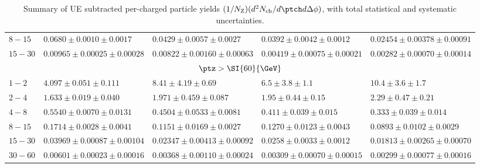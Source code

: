 \begin{table}[!ht]
\begin{center}
\begin{tabular}{|l|l|l|l|l|}
\footnotesize {$8 - 15$} & \scriptsize {$0.0680 \pm 0.0010 \pm 0.0017$}  & \scriptsize {$0.0429 \pm 0.0057 \pm 0.0027$}  & \scriptsize {$0.0392 \pm 0.0042 \pm 0.0012$}  & \scriptsize {$0.02454 \pm 0.00378 \pm 0.00091$}  \\
\footnotesize {$15 - 30$} & \scriptsize {$0.00965 \pm 0.00025 \pm 0.00028$}  & \scriptsize {$0.00822 \pm 0.00160 \pm 0.00063$}  & \scriptsize {$0.00419 \pm 0.00075 \pm 0.00021$}  & \scriptsize {$0.00282 \pm 0.00070 \pm 0.00014$}  \\
\hline \hline
\multicolumn{5}{|c|}{\small {$\ptz > \SI{60}{\GeV}$}} \\ \hline
\footnotesize {$1 - 2$} & \scriptsize {$4.097 \pm 0.051 \pm 0.111$}  & \scriptsize {$8.41 \pm 4.19 \pm 0.69$}  & \scriptsize {$6.5 \pm 3.8 \pm 1.1$}  & \scriptsize {$10.4 \pm 3.6 \pm 1.7$}  \\
\footnotesize {$2 - 4$} & \scriptsize {$1.633 \pm 0.019 \pm 0.040$}  & \scriptsize {$1.971 \pm 0.459 \pm 0.087$}  & \scriptsize {$1.95 \pm 0.44 \pm 0.15$}  & \scriptsize {$2.29 \pm 0.47 \pm 0.21$}  \\
\footnotesize {$4 - 8$} & \scriptsize {$0.5540 \pm 0.0070 \pm 0.0131$}  & \scriptsize {$0.4504 \pm 0.0533 \pm 0.0081$}  & \scriptsize {$0.411 \pm 0.039 \pm 0.015$}  & \scriptsize {$0.333 \pm 0.039 \pm 0.014$}  \\
\footnotesize {$8 - 15$} & \scriptsize {$0.1714 \pm 0.0028 \pm 0.0041$}  & \scriptsize {$0.1151 \pm 0.0169 \pm 0.0027$}  & \scriptsize {$0.1270 \pm 0.0123 \pm 0.0043$}  & \scriptsize {$0.0893 \pm 0.0102 \pm 0.0029$}  \\
\footnotesize {$15 - 30$} & \scriptsize {$0.03969 \pm 0.00087 \pm 0.00104$}  & \scriptsize {$0.02347 \pm 0.00413 \pm 0.00092$}  & \scriptsize {$0.0258 \pm 0.0033 \pm 0.0012$}  & \scriptsize {$0.01813 \pm 0.00265 \pm 0.00070$}  \\
\footnotesize {$30 - 60$} & \scriptsize {$0.00601 \pm 0.00023 \pm 0.00016$}  & \scriptsize {$0.00368 \pm 0.00110 \pm 0.00024$}  & \scriptsize {$0.00309 \pm 0.00070 \pm 0.00015$}  & \scriptsize {$0.00299 \pm 0.00077 \pm 0.00016$}  \\
\hline
\end{tabular}
\caption{Summary of UE subtracted per-\Zboson charged particle yields $(1/N_\mathrm{Z})(d^2N_\mathrm{ch}/d\ptch d\Delta\phi)$, with total statistical and systematic uncertainties.}
\label{tab1}
\end{center}
\end{table}
